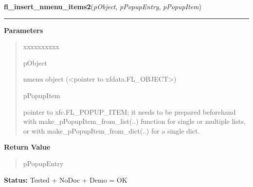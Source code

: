 \hspace{.8\funcindent}\begin{boxedminipage}{\funcwidth}

    \raggedright \textbf{fl\_insert\_nmenu\_items2}(\textit{pObject}, \textit{pPopupEntry}, \textit{pPopupItem})

    \vspace{-1.5ex}

    \rule{\textwidth}{0.5\fboxrule}
\setlength{\parskip}{2ex}
\setlength{\parskip}{1ex}
      \textbf{Parameters}
      \vspace{-1ex}

      \begin{quote}
        \begin{Ventry}{xxxxxxxxxx}

          \item[pObject]

          nmenu object ({\textless}pointer to 
          xfdata.FL\_OBJECT{\textgreater})

          \item[pPopupItem]

          pointer to xfc.FL\_POPUP\_ITEM; it needs to be prepared 
          beforehand with make\_pPopupItem\_from\_list(..) function for 
          single or multiple lists, or with 
          make\_pPopupItem\_from\_dict(..) for a single dict.

        \end{Ventry}

      \end{quote}

      \textbf{Return Value}
    \vspace{-1ex}

      \begin{quote}
      pPopupEntry

      \end{quote}

\textbf{Status:} Tested + NoDoc + Demo = OK



    \end{boxedminipage}

    \label{xformslib:library:fl_replace_nmenu_items2}

    \vspace{0.5ex}

